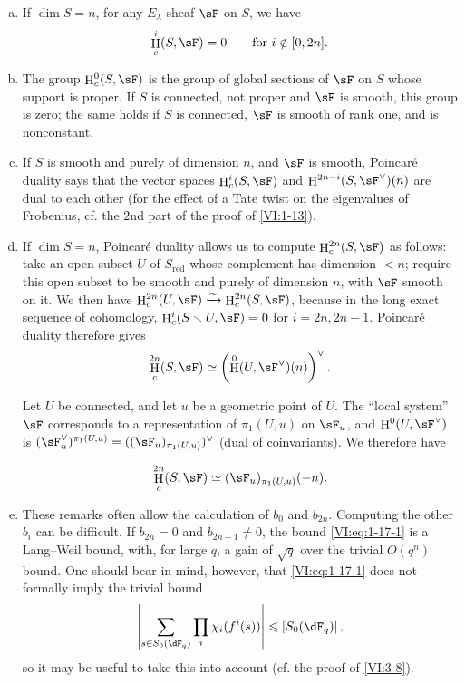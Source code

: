 \documentclass[oneside]{book}
\DeclareMathOperator{\h}{H}
\newcommand{\iso}{\xrightarrow\sim}
\renewcommand{\setminus}{\smallsetminus}
\theoremstyle{sga-source}
\theoremstyle{sga-source-dash}
\theoremstyle{sga-source-dotdash}
\theoremstyle{sga-source-number-note-dash}
\theoremstyle{sga-source-note-number-dotdash}
\theoremstyle{sga-source-example-dotdash}
\theoremstyle{sga-source-inline-number}
\theoremstyle{sga-source-bare-number}
\theoremstyle{sga-source}
\newcommand{\PrintPage}[1]{}\newcommand{\MathPage}[1]{}\newcommand{\PrintCite}[2]{#1}\newcommand{\var}[3]{#2}
\begin{document}
\begin{enumerate}[a)]
  \item If $\dim S=n$, for any $E_\lambda$-sheaf $\sF$ on $S$, we have 
    \[
      \h_c^i(S,\sF) = 0 \qquad \text{for $i\notin [0,2n]$.}
    \]
  \item The group $\h_c^0(S,\sF)$ is the group of global sections of $\sF$ 
    on $S$ whose support is proper. If $S$ is connected, not proper and 
    $\sF$ is smooth, this group is zero; the same holds if $S$ is connected, 
    $\sF$ is smooth of rank one, and is nonconstant.
  \item If $S$ is smooth and purely of dimension $n$, and $\sF$ is smooth, 
    Poincaré duality says that the vector spaces 
    \var{$\h_c^i(X,\sF)$ and $\h^{2n-i}(X,\sF^\vee)(2n)$}{$\h_c^i(S,\sF)$ and $\h^{2n-i}(S,\sF^\vee)(n)$}{S45-SOL-0707} are dual to each other 
    (for the effect of a Tate twist on the eigenvalues of Frobenius, 
    cf. the $2$nd part of the proof of \ref{VI:1-13}).
  \item If $\dim S=n$, Poincaré duality allows us to compute 
    $\h_c^{2n}(S,\sF)$ as follows: take an open subset $U$ of $S_\text{red}$ 
    whose complement has dimension $<n$; require this open subset to be smooth and 
    purely of dimension $n$, with $\sF$ smooth on it. We then have 
    $\h_c^{2n}(U,\sF) \iso \h_c^{2n}(S,\sF)$, because in the long exact sequence 
    of cohomology, $\h_c^i(S\setminus U,\sF) = 0$ for $i=2n,2n-1$. 
    Poincaré duality therefore gives 
    \[
      \h_c^{2n}(S,\sF) \simeq \left(\var{\h^0(U,\sF^\vee)(2n)}{\h^0(U,\sF^\vee)(n)}{S45-SOL-0710}\right)^\vee \text{.}
    \]
    
    Let $U$ be connected, and let $u$ be a geometric point of $U$. The 
    ``local system'' $\sF$ corresponds to a representation of 
    $\pi_1(U,u)$ on $\sF_u$, and $\h^0(U,\sF^\vee)$ is 
    $(\sF_u^\vee)^{\pi_1(U,u)}=((\sF_u)_{\pi_1(U,u)})^\vee$ (dual of 
    coinvariants). We therefore have 
    \PrintPage{179}
\[
      \h_c^{2n}(S,\sF) \simeq \var{(\sF_u)_{\pi_1(U,u)}(-2n)}{(\sF_u)_{\pi_1(U,u)}(-n)}{S45-SOL-0711} \text{.}
    \]
  \item These remarks often allow the calculation of $b_0$ and $b_{2n}$. 
    Computing the other $b_i$ can be difficult. If $b_{2n}=0$ and 
    $b_{2n-1}\ne 0$, the bound \eqref{VI:eq:1-17-1} is a Lang--Weil bound, 
    with, for large $q$, a gain of $\sqrt q$ over the 
    trivial $O(q^n)$ bound. One should bear in mind, however, that 
    \eqref{VI:eq:1-17-1} does not formally imply the trivial bound 
    \[
      \left|\sum_{s\in S_0(\dF_q)} \prod_i \chi_i(f^i(s))\right| \leqslant \left| S_0(\dF_q)\right| \text{,}
    \]
    so it may be useful to take this into account (cf. the proof of \ref{VI:3-8}). 
\end{enumerate}
\end{document}
